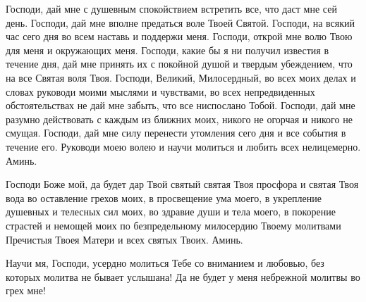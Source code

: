 \mychapterending


\begin{mymulticols}



Господи, дай мне с душевным спокойствием встретить все, что даст мне сей день. Господи, дай мне вполне предаться воле Твоей Святой. Господи, на всякий час сего дня во всем наставь и поддержи меня. Господи, открой мне волю Твою для меня и окружающих меня. Господи, какие бы я ни получил известия в течение дня, дай мне принять их с покойной душой и твердым убеждением, что на все Святая воля Твоя. Господи, Великий, Милосердный, во всех моих делах и словах руководи моими мыслями и чувствами, во всех непредвиденных обстоятельствах не дай мне забыть, что все ниспослано Тобой. Господи, дай мне разумно действовать с каждым из ближних моих, никого не огорчая и никого не смущая. Господи, дай мне силу перенести утомления сего дня и все события в течение его. Руководи моею волею и научи молиться и любить всех нелицемерно. Аминь.

\end{mymulticols}

\mychapterending


\begin{mymulticols}



Господи Боже мой, да будет дар Твой святый святая Твоя просфора и святая Твоя вода во оставление грехов моих, в просвещение ума моего, в укрепление душевных и телесных сил моих, во здравие души и тела моего, в покорение страстей и немощей моих по безпредельному милосердию Твоему молитвами Пречистыя Твоея Матери и всех святых Твоих. Аминь.



\end{mymulticols}

\mychapterending


\begin{mymulticols}




Научи мя, Господи, усердно молиться Тебе со вниманием и любовью, без которых молитва не бывает услышана! Да не будет у меня небрежной молитвы во грех мне!

\end{mymulticols}

